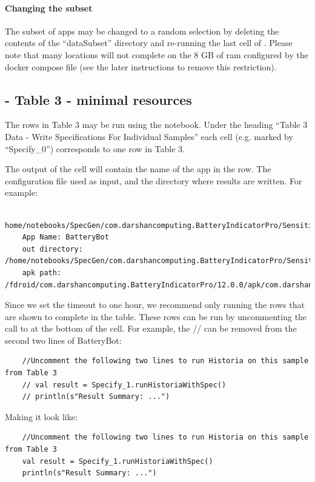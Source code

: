 \documentclass{acmart} %
\begin{document}
\paragraph{Changing the subset} The subset of apps may be changed to a random selection by deleting the contents of the ``dataSubset'' directory and re-running the last cell of .  Please note that many locations will not complete on the 8 GB of ram configured by the docker compose file (see the later instructions to remove this restriction).  


\subsection{ - Table 3 - minimal resources}

The rows in Table 3 may be run using the  notebook.
Under the heading ``Table 3 Data - Write Specifications For Individual Samples'' each cell (e.g. marked by ``Specify\_0'') corresponds to one row in Table 3.

The output of the cell will contain the name of the app in the row. The configuration file used as input, and the directory where results are written.  For example:

\begin{lstlisting}
    home/notebooks/SpecGen/com.darshancomputing.BatteryIndicatorPro/SensitiveDerefCallinCaused/0/config.json
    App Name: BatteryBot
    out directory: /home/notebooks/SpecGen/com.darshancomputing.BatteryIndicatorPro/SensitiveDerefCallinCaused/0
    apk path: /fdroid/com.darshancomputing.BatteryIndicatorPro/12.0.0/apk/com.darshancomputing.BatteryIndicatorPro\_26016.apk
\end{lstlisting}

Since we set the timeout to one hour, we recommend only running the rows that are shown to complete in the table.  These rows can be run by uncommenting the call to  at the bottom of the cell.  For example, the // can be removed from the second two lines of BatteryBot:

\begin{lstlisting}
    //Uncomment the following two lines to run Historia on this sample from Table 3
    // val result = Specify_1.runHistoriaWithSpec()
    // println(s"Result Summary: ...")
\end{lstlisting}

Making it look like: 

\begin{lstlisting}
    //Uncomment the following two lines to run Historia on this sample from Table 3
    val result = Specify_1.runHistoriaWithSpec()
    println(s"Result Summary: ...")
\end{lstlisting}
\end{document}
